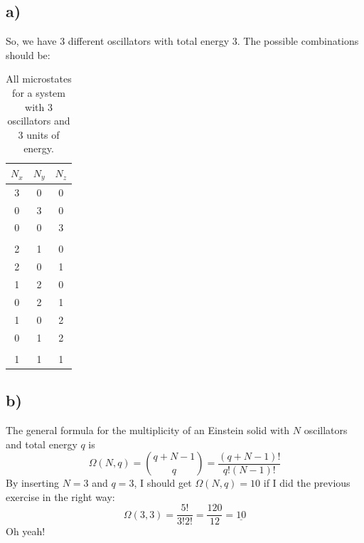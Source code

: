 \documentclass{scrartcl}
\begin{document}
\subsection*{a)}
So, we have 3 different oscillators with total energy 3. The possible combinations should be:
\begin{table}[!htbp]
 \centering
 \begin{tabular}{ccc}
   \toprule
   $N_x$ & $N_y$ & $N_z$\\
   \midrule
   3 & 0 & 0\\
   0 & 3 & 0\\
   0 & 0 & 3\\
     &   &  \\
   2 & 1 & 0\\
   2 & 0 & 1\\
   1 & 2 & 0\\
   0 & 2 & 1\\
   1 & 0 & 2\\
   0 & 1 & 2\\
     &   &  \\
   1 & 1 & 1\\
   \bottomrule
 \end{tabular}
 \caption{All microstates for a system with 3 oscillators and 3 units of energy.}
 \label{tab:table1}
\end{table}
\subsection*{b)}
The general formula for the multiplicity of an Einstein solid with $N$ oscillators and total energy $q$ is
\begin{equation}
\Omega(N,q)=\binom{q+N-1}{q}=\frac{(q+N-1)!}{q!(N-1)!}
\end{equation}
By inserting $N=3$ and $q=3$, I should get $\Omega(N,q)=10$ if I did the previous exercise in the right way: 
$$\Omega(3,3)=\frac{5!}{3!2!}=\frac{120}{12}=\underline{10}$$
Oh yeah!
\end{document}

